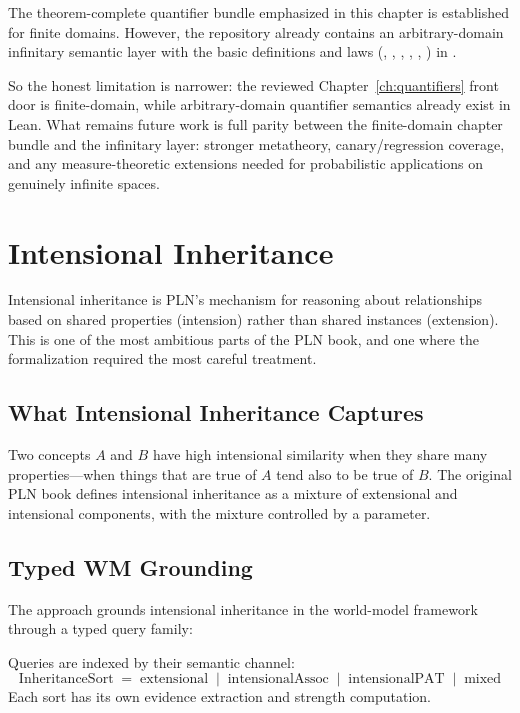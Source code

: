 \documentclass[11pt,openany]{report}
\begin{document}
The theorem-complete quantifier bundle emphasized in this chapter is
established for finite domains.  However, the repository already contains
an arbitrary-domain infinitary semantic layer with the basic definitions
and laws
(, ,
, ,
, )
in .

So the honest limitation is narrower: the reviewed
Chapter~\ref{ch:quantifiers} front door is finite-domain, while
arbitrary-domain quantifier semantics already exist in Lean.  What
remains future work is full parity between the finite-domain chapter
bundle and the infinitary layer: stronger metatheory, canary/regression
coverage, and any measure-theoretic extensions needed for probabilistic
applications on genuinely infinite spaces.


\chapter{Intensional Inheritance}
\label{ch:intensional}

Intensional inheritance is PLN's mechanism for reasoning about
relationships based on shared properties (intension) rather than shared
instances (extension).  This is one of the most ambitious parts of the
PLN book, and one where the formalization required the most careful
treatment.

\section{What Intensional Inheritance Captures}

Two concepts $A$ and $B$ have high intensional similarity when they share
many properties---when things that are true of $A$ tend also to be true
of $B$.  The original PLN book defines intensional inheritance as a
mixture of extensional and intensional components, with the mixture
controlled by a parameter.

\section{Typed WM Grounding}

The \xiPLN{} approach grounds intensional inheritance in the world-model
framework through a typed query family:

\begin{definition}
Queries are indexed by their semantic channel:
\[
  \mathrm{InheritanceSort} \;=\;
  \mathrm{extensional} \;\mid\;
  \mathrm{intensionalAssoc} \;\mid\;
  \mathrm{intensionalPAT} \;\mid\;
  \mathrm{mixed}
\]
Each sort has its own evidence extraction and strength computation.
\end{definition}
\end{document}
